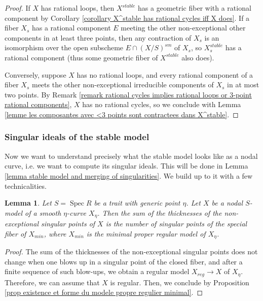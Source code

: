 \documentclass[a4paper,12pt]{amsart} %
\numberwithin{equation}{subsection}
\newcommand{\Spec}{\operatorname{Spec}}
\theoremstyle{definition}
\theoremstyle{plain}%
\newtheorem{lemma}[definition]{Lemma}
\theoremstyle{remark}
\begin{document}
\begin{proof}
If $X$ has rational loops, then $X^{stable}$ has a geometric fiber with a rational component by Corollary \ref{corollary X^stable has rational cycles iff X does}. If a fiber $X_s$ has a rational component $E$ meeting the other non-exceptional other components in at least three points, then any contraction of $X_s$ is an isomorphism over the open subscheme $E\cap (X/S)^{sm}$ of $X_s$, so $X^{stable}_s$ has a rational component (thus some geometric fiber of $X^{stable}$ also does).

Conversely, suppose $X$ has no rational loops, and every rational component of a fiber $X_s$ meets the other non-exceptional irreducible components of $X_s$ in at most two points. By Remark \ref{remark rational cycles implies rational loops or 3-point rational components}, $X$ has no rational cycles, so we conclude with Lemma \ref{lemme les composantes avec <3 points sont contractees dans X^stable}.
\end{proof}


\subsubsection{Singular ideals of the stable model}
Now we want to understand precisely what the stable model looks like as a nodal curve, i.e. we want to compute its singular ideals. This will be done in Lemma \ref{lemma stable model and merging of singularities}. We build up to it with a few technicalities.


\begin{lemma}\label{lemma invariance of the sum of thicknesses of non exceptional points over a dvr}
Let $S=\Spec R$ be a trait with generic point $\eta$. Let $X$ be a nodal $S$-model of a smooth $\eta$-curve $X_\eta$. Then the sum of the thicknesses of the non-exceptional singular points of $X$ is the number of singular points of the special fiber of $X_{min}$, where $X_{min}$ is the minimal proper regular model of $X_\eta$.
\end{lemma}

\begin{proof}
The sum of the thicknesses of the non-exceptional singular points does not change when one blows up in a singular point of the closed fiber, and after a finite sequence of such blow-ups, we obtain a regular model $X_{reg}\to X$ of $X_\eta$. Therefore, we can assume that $X$ is regular. Then, we conclude by Proposition \ref{prop existence et forme du modele propre regulier minimal}.
\end{proof}
\end{document}
